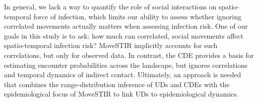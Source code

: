 \documentclass[letterpaper]{article}
\begin{document}
In general, we lack a way to quantify the role of social interactions on spatio-temporal force of infection, which limits our ability to assess whether ignoring correlated movements actually matters when assessing infection risk. One of our goals in this study is to ask: how much can correlated, social movements affect spatio-temporal infection risk? 
MoveSTIR implicitly accounts for such correlations, but only for observed data. In contrast, the CDE provides a basis for estimating encounter probabilities across the landscape, but ignores correlations and temporal dynamics of indirect contact.
Ultimately, an approach is needed that combines the range-distribution inference of UDs and CDEs \citep{Alston2022,Noonan2021} with the epidemiological focus of MoveSTIR to link UDs to epidemiological dynamics. 






\end{document}
